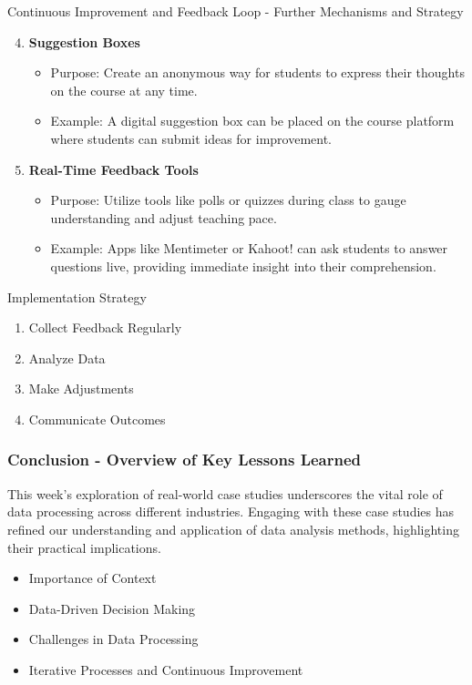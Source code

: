 \documentclass[aspectratio=169]{beamer}
\begin{document}
\begin{frame}[fragile]{Continuous Improvement and Feedback Loop - Further Mechanisms and Strategy}
    \begin{enumerate}
        \setcounter{enumi}{3}
        \item \textbf{Suggestion Boxes}
            \begin{itemize}
                \item Purpose: Create an anonymous way for students to express their thoughts on the course at any time.
                \item Example: A digital suggestion box can be placed on the course platform where students can submit ideas for improvement.
            \end{itemize}
        \item \textbf{Real-Time Feedback Tools}
            \begin{itemize}
                \item Purpose: Utilize tools like polls or quizzes during class to gauge understanding and adjust teaching pace.
                \item Example: Apps like Mentimeter or Kahoot! can ask students to answer questions live, providing immediate insight into their comprehension.
            \end{itemize}
    \end{enumerate}
    
    \begin{block}{Implementation Strategy}
        \begin{enumerate}
            \item Collect Feedback Regularly
            \item Analyze Data
            \item Make Adjustments
            \item Communicate Outcomes
        \end{enumerate}
    \end{block}
\end{frame}

\begin{frame}[fragile]
    \frametitle{Conclusion - Overview of Key Lessons Learned}
    This week’s exploration of real-world case studies underscores the vital role of data processing across different industries. Engaging with these case studies has refined our understanding and application of data analysis methods, highlighting their practical implications.

    \begin{itemize}
        \item Importance of Context
        \item Data-Driven Decision Making
        \item Challenges in Data Processing
        \item Iterative Processes and Continuous Improvement
    \end{itemize}
\end{frame}
\end{document}

